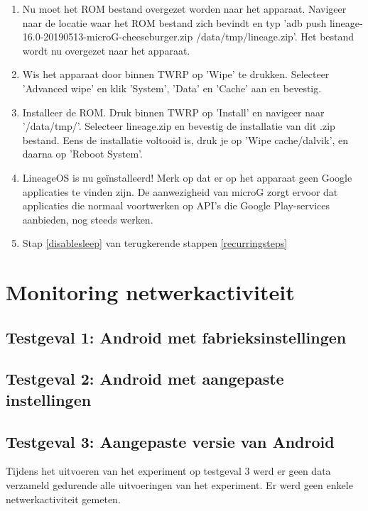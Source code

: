\begin{enumerate}
    \item Nu moet het ROM bestand overgezet worden naar het apparaat. Navigeer naar de locatie waar het ROM bestand zich bevindt en typ 'adb push lineage-16.0-20190513-microG-cheeseburger.zip /data/tmp/lineage.zip'. Het bestand wordt nu overgezet naar het apparaat.
    \item Wis het apparaat door binnen TWRP op 'Wipe' te drukken. Selecteer 'Advanced wipe' en klik 'System', 'Data' en 'Cache' aan en bevestig.
    \item Installeer de ROM. Druk binnen TWRP op 'Install' en navigeer naar '/data/tmp/'. Selecteer lineage.zip en bevestig de installatie van dit .zip bestand. Eens de installatie voltooid is, druk je op 'Wipe cache/dalvik', en daarna op 'Reboot System'.
    \item 
    LineageOS is nu geïnstalleerd! Merk op dat er op het apparaat geen Google applicaties te vinden zijn. De aanwezigheid van microG zorgt ervoor dat applicaties die normaal voortwerken op API's die Google Play-services aanbieden, nog steeds werken.
    \item Stap \ref{disablesleep} van terugkerende stappen \ref{recurringsteps}
\end{enumerate}

\section{Monitoring netwerkactiviteit}

\subsection{Testgeval 1: Android met fabrieksinstellingen}

\subsection{Testgeval 2: Android met aangepaste instellingen}

\subsection{Testgeval 3: Aangepaste versie van Android}
Tijdens het uitvoeren van het experiment op testgeval 3 werd er geen data verzameld gedurende alle uitvoeringen van het experiment. Er werd geen enkele netwerkactiviteit gemeten.